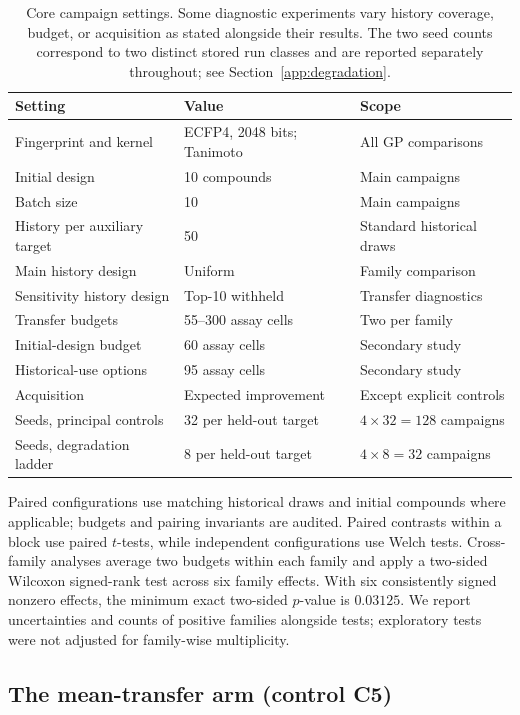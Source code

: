 \documentclass[10pt]{article}
\begin{document}
\begin{table}[htbp]
\centering\small
\begin{tabular}{lll}
\toprule
Setting & Value & Scope \\
\midrule
Fingerprint and kernel & ECFP4, 2048 bits; Tanimoto & All GP comparisons \\
Initial design & 10 compounds & Main campaigns \\
Batch size & 10 & Main campaigns \\
History per auxiliary target & 50 & Standard historical draws \\
Main history design & Uniform & Family comparison \\
Sensitivity history design & Top-10 withheld & Transfer diagnostics \\
Transfer budgets & 55--300 assay cells & Two per family \\
Initial-design budget & 60 assay cells & Secondary study \\
Historical-use options & 95 assay cells & Secondary study \\
Acquisition & Expected improvement & Except explicit controls \\
Seeds, principal controls & 32 per held-out target & $4\times32=128$ campaigns \\
Seeds, degradation ladder & 8 per held-out target & $4\times8=32$ campaigns \\
\bottomrule
\end{tabular}
\caption{Core campaign settings. Some diagnostic experiments vary history
coverage, budget, or acquisition as stated alongside their results. The two
seed counts correspond to two distinct stored run classes and are reported
separately throughout; see Section~\ref{app:degradation}.}
\label{tab:params}
\end{table}

Paired configurations use matching historical draws and initial compounds
where applicable; budgets and pairing invariants are audited. Paired
contrasts within a block use paired $t$-tests, while independent
configurations use Welch tests. Cross-family analyses average two budgets
within each family and apply a two-sided Wilcoxon signed-rank test across six
family effects. With six consistently signed nonzero effects, the minimum
exact two-sided $p$-value is $0.03125$. We report uncertainties and counts of
positive families alongside tests; exploratory tests were not adjusted for
family-wise multiplicity.

\subsection{The mean-transfer arm (control C5)}
\label{app:basis}
\end{document}

